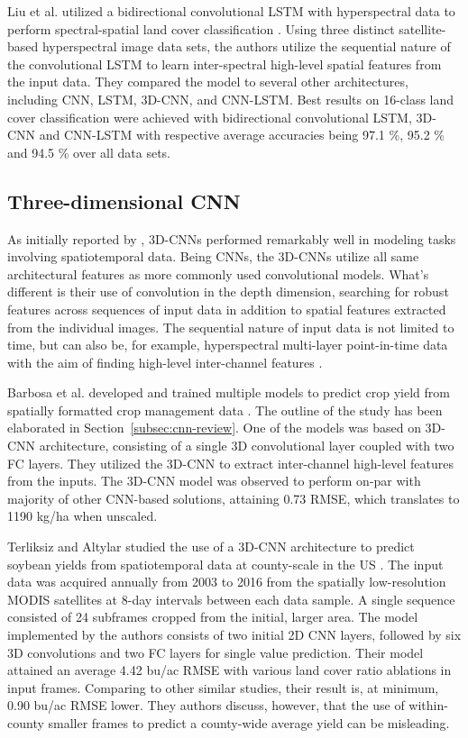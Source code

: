 Liu et al. utilized a bidirectional convolutional LSTM with hyperspectral data to perform spectral-spatial land cover classification \cite{Liu2017}. Using three distinct satellite-based hyperspectral image data sets, the authors utilize the sequential nature of the convolutional LSTM to learn inter-spectral high-level spatial features from the input data. They compared the model to several other architectures, including CNN, LSTM, 3D-CNN, and CNN-LSTM. Best results on 16-class land cover classification were achieved with bidirectional convolutional LSTM, 3D-CNN and CNN-LSTM with respective average accuracies being 97.1 \%, 95.2 \% and 94.5 \% over all data sets.


\subsection{Three-dimensional CNN}
\label{subsec:3d-cnn-review}

As initially reported by \cite{Tran2015}, 3D-CNNs performed remarkably well in modeling tasks involving spatiotemporal data. Being CNNs, the 3D-CNNs utilize all same architectural features as more commonly used convolutional models. What's different is their use of convolution in the depth dimension, searching for robust features across sequences of input data in addition to spatial features extracted from the individual images. The sequential nature of input data is not limited to time, but can also be, for example, hyperspectral multi-layer point-in-time data with the aim of finding high-level inter-channel features \cite{Li2017}.

Barbosa et al. developed and trained multiple models to predict crop yield from spatially formatted crop management data \cite{Barbosa2020}. The outline of the study has been elaborated in Section~\ref{subsec:cnn-review}. One of the models was based on 3D-CNN architecture, consisting of a single 3D convolutional layer coupled with two FC layers. They utilized the 3D-CNN to extract inter-channel high-level features from the inputs. The 3D-CNN model was observed to perform on-par with majority of other CNN-based solutions, attaining 0.73 RMSE, which translates to 1190 kg/ha when unscaled.

Terliksiz and Altylar studied the use of a 3D-CNN architecture to predict soybean yields from spatiotemporal data at county-scale in the US \cite{Terliksiz2019}. The input data was acquired annually from 2003 to 2016 from the spatially low-resolution MODIS satellites at 8-day intervals between each data sample. A single sequence consisted of 24 subframes cropped from the initial, larger area. The model implemented by the authors consists of two initial 2D CNN layers, followed by six 3D convolutions and two FC layers for single value prediction. Their model attained an average 4.42 bu/ac RMSE with various land cover ratio ablations in input frames. Comparing to other similar studies, their result is, at minimum, 0.90 bu/ac RMSE lower. They authors discuss, however, that the use of within-county smaller frames to predict a county-wide average yield can be misleading.

